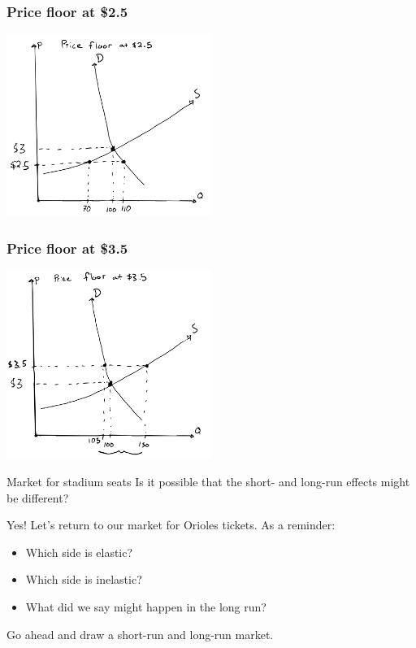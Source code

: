 \documentclass[aspectratio=169]{beamer}
\begin{document}
\begin{frame}
    \frametitle{Price floor at \$2.5}
    \centering
    \includegraphics[width = 0.5\textwidth,keepaspectratio]{coffee_floor_250.png}
\end{frame}

\begin{frame}
    \frametitle{Price floor at \$3.5}
    \centering
    \includegraphics[width = 0.5\textwidth,keepaspectratio]{coffee_floor_350.png}
\end{frame}

\begin{frame}{Market for stadium seats}
    Is it possible that the short- and long-run effects might be different?

    \vspace{5mm}

    Yes! Let's return to our market for Orioles tickets. As a reminder:
    \begin{itemize}
        \item Which side is elastic?
        \item Which side is inelastic?
        \item What did we say might happen in the long run?
    \end{itemize}

    Go ahead and draw a short-run and long-run market.
\end{frame}
\end{document}
